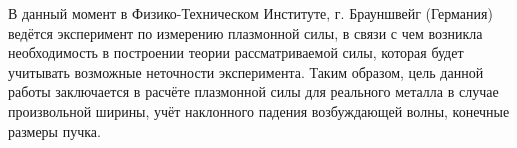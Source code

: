 В данный момент в Физико-Техническом Институте, г. Брауншвейг (Германия) ведётся эксперимент по измерению плазмонной силы, в связи с чем возникла 
необходимость в построении теории рассматриваемой силы, которая будет учитывать возможные неточности эксперимента. Таким образом, цель данной работы заключается в расчёте плазмонной силы для реального металла в случае произвольной ширины, учёт наклонного падения возбуждающей волны, конечные 
размеры пучка. 
